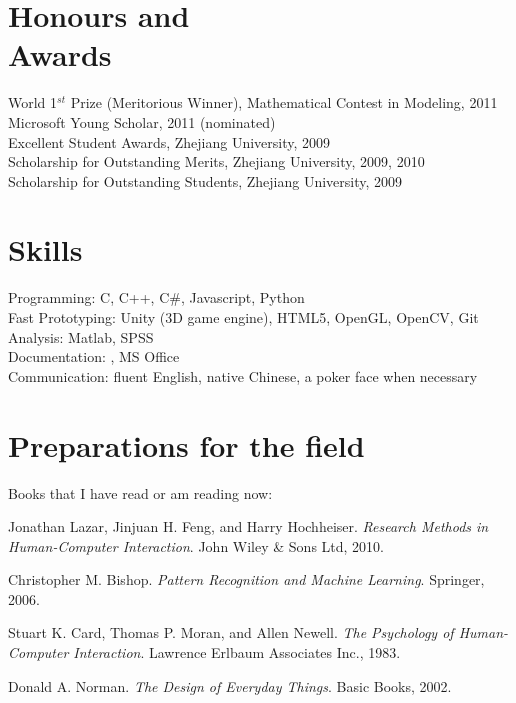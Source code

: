 \documentclass[margin,line]{resume}
\begin{document}
\begin{resume}
    \section{\mysidestyle Honours and\\Awards} 

   World 1$^{st}$ Prize (Meritorious Winner), Mathematical Contest in Modeling, 2011 \\
   Microsoft Young Scholar, 2011 (nominated) \\
   Excellent Student Awards, Zhejiang University, 2009\\
   Scholarship for Outstanding Merits, Zhejiang University, 2009, 2010\\
   Scholarship for Outstanding Students, Zhejiang University, 2009

    \section{\mysidestyle Skills} 
    
    Programming: C, C++, C\#, Javascript, Python \\
    Fast Prototyping: Unity (3D game engine), HTML5, OpenGL, OpenCV, Git\\
    Analysis: Matlab, SPSS \\
    Documentation: \LaTeXe, MS Office \\
    Communication: fluent English, native Chinese, a poker face when necessary



    \section{\mysidestyle Preparations for the field} 
    
    Books that I have read or am reading now:
    \begin{list2}
        \item Jonathan Lazar, Jinjuan H. Feng, and Harry Hochheiser. \textsl{Research Methods in Human-Computer Interaction}. John Wiley \& Sons Ltd, 2010.
        \item Christopher M. Bishop. \emph{Pattern Recognition and Machine Learning}. Springer, 2006.
   	\item Stuart K. Card, Thomas P. Moran, and Allen Newell. \textsl{The Psychology of Human-Computer Interaction}. Lawrence Erlbaum Associates Inc., 1983.
	\item Donald A. Norman. \textsl{The Design of Everyday Things}. Basic Books, 2002.
        

\end{list2}
\end{resume}
\end{document}
